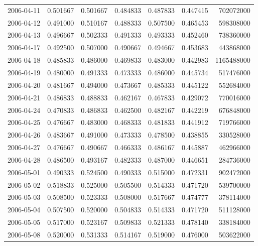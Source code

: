 \begin{tabular}{lrrrrrr}
2006-04-11 &    0.501667 &    0.501667 &    0.484833 &    0.487833 &    0.447415 &   702072000 \\
2006-04-12 &    0.491000 &    0.510167 &    0.488333 &    0.507500 &    0.465453 &   598308000 \\
2006-04-13 &    0.496667 &    0.502333 &    0.491333 &    0.493333 &    0.452460 &   738360000 \\
2006-04-17 &    0.492500 &    0.507000 &    0.490667 &    0.494667 &    0.453683 &   443868000 \\
2006-04-18 &    0.485833 &    0.486000 &    0.469833 &    0.483000 &    0.442983 &  1165488000 \\
2006-04-19 &    0.480000 &    0.491333 &    0.473333 &    0.486000 &    0.445734 &   517476000 \\
2006-04-20 &    0.481667 &    0.494000 &    0.473667 &    0.485333 &    0.445122 &   552684000 \\
2006-04-21 &    0.486833 &    0.488833 &    0.462167 &    0.467833 &    0.429072 &   770016000 \\
2006-04-24 &    0.470833 &    0.486833 &    0.462500 &    0.482167 &    0.442219 &   676848000 \\
2006-04-25 &    0.476667 &    0.483000 &    0.468333 &    0.481833 &    0.441912 &   719766000 \\
2006-04-26 &    0.483667 &    0.491000 &    0.473333 &    0.478500 &    0.438855 &   330528000 \\
2006-04-27 &    0.476667 &    0.490667 &    0.466333 &    0.486167 &    0.445887 &   462966000 \\
2006-04-28 &    0.486500 &    0.493167 &    0.482333 &    0.487000 &    0.446651 &   284736000 \\
2006-05-01 &    0.490333 &    0.524500 &    0.490333 &    0.515000 &    0.472331 &   902472000 \\
2006-05-02 &    0.518833 &    0.525000 &    0.505500 &    0.514333 &    0.471720 &   539700000 \\
2006-05-03 &    0.508500 &    0.523333 &    0.508000 &    0.517667 &    0.474777 &   378114000 \\
2006-05-04 &    0.507500 &    0.520000 &    0.504833 &    0.514333 &    0.471720 &   511128000 \\
2006-05-05 &    0.517000 &    0.523167 &    0.509833 &    0.521333 &    0.478140 &   338184000 \\
2006-05-08 &    0.520000 &    0.531333 &    0.514167 &    0.519000 &    0.476000 &   503622000 \\

\end{tabular}
